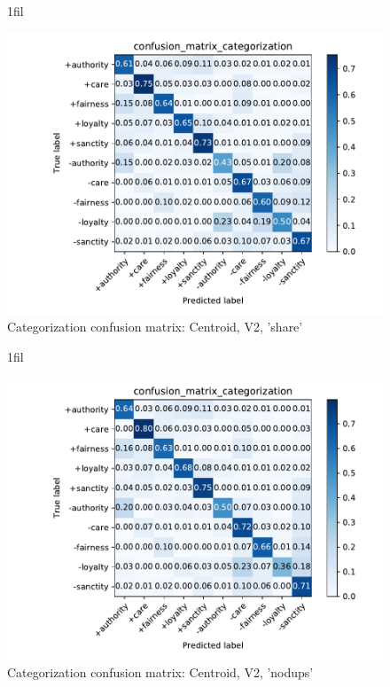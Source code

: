 \documentclass{article}
\makeatletter
\newcommand*{\centerfloat}{%
  \parindent \z@
  \leftskip \z@ \@plus 1fil \@minus \textwidth
  \rightskip\leftskip
  \parfillskip \z@skip}
\makeatother
\begin{document}
\begin{figure}[H]
    \centerfloat
    \caption{Categorization confusion matrix: Centroid, V2, 'share'}
    \includegraphics[width=1.3\linewidth]{../../plots-2/confusion-matrix-centroid-v2-share/confusion_matrix_categorization.pdf}
\end{figure}

\begin{figure}[H]
    \centerfloat
    \caption{Categorization confusion matrix: Centroid, V2, 'nodups'}
    \includegraphics[width=1.3\linewidth]{../../plots-2/confusion-matrix-centroid-v2-nodups/confusion_matrix_categorization.pdf}
\end{figure}
\end{document}
